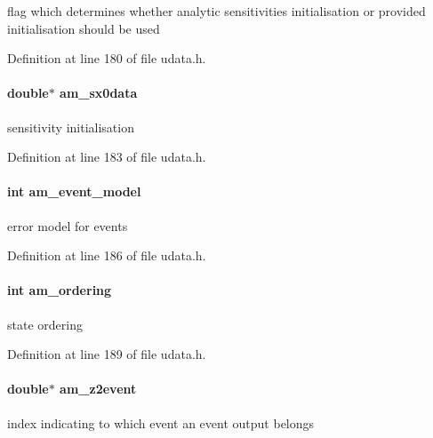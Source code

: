 flag which determines whether analytic sensitivities initialisation or provided initialisation should be used 

Definition at line 180 of file udata.\+h.

\hypertarget{struct_user_data_a7ac27602345668b3a2bcabac4c7af733}{}
\paragraph[{am\+\_\+sx0data}]{\setlength{\rightskip}{0pt plus 5cm}double$\ast$ am\+\_\+sx0data}\label{struct_user_data_a7ac27602345668b3a2bcabac4c7af733}
sensitivity initialisation 

Definition at line 183 of file udata.\+h.

\hypertarget{struct_user_data_ace3cae0f78a3365a5fac7d7daa9928ff}{}
\paragraph[{am\+\_\+event\+\_\+model}]{\setlength{\rightskip}{0pt plus 5cm}int am\+\_\+event\+\_\+model}\label{struct_user_data_ace3cae0f78a3365a5fac7d7daa9928ff}
error model for events 

Definition at line 186 of file udata.\+h.

\hypertarget{struct_user_data_a260a14e35469f1516b194f4f065a9794}{}
\paragraph[{am\+\_\+ordering}]{\setlength{\rightskip}{0pt plus 5cm}int am\+\_\+ordering}\label{struct_user_data_a260a14e35469f1516b194f4f065a9794}
state ordering 

Definition at line 189 of file udata.\+h.

\hypertarget{struct_user_data_af16fc75b57c68ab1d3784cc71ab073a9}{}
\paragraph[{am\+\_\+z2event}]{\setlength{\rightskip}{0pt plus 5cm}double$\ast$ am\+\_\+z2event}\label{struct_user_data_af16fc75b57c68ab1d3784cc71ab073a9}
index indicating to which event an event output belongs 

